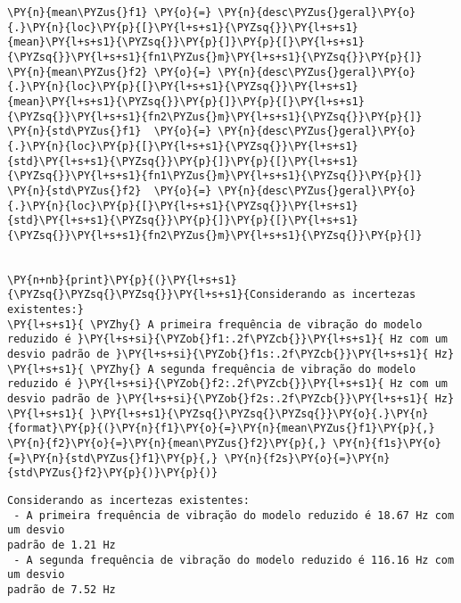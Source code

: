     \begin{tcolorbox}[breakable, size=fbox, boxrule=1pt, pad at break*=1mm,colback=cellbackground, colframe=cellborder]
\begin{Verbatim}[commandchars=\\\{\}]
\PY{n}{mean\PYZus{}f1} \PY{o}{=} \PY{n}{desc\PYZus{}geral}\PY{o}{.}\PY{n}{loc}\PY{p}{[}\PY{l+s+s1}{\PYZsq{}}\PY{l+s+s1}{mean}\PY{l+s+s1}{\PYZsq{}}\PY{p}{]}\PY{p}{[}\PY{l+s+s1}{\PYZsq{}}\PY{l+s+s1}{fn1\PYZus{}m}\PY{l+s+s1}{\PYZsq{}}\PY{p}{]}
\PY{n}{mean\PYZus{}f2} \PY{o}{=} \PY{n}{desc\PYZus{}geral}\PY{o}{.}\PY{n}{loc}\PY{p}{[}\PY{l+s+s1}{\PYZsq{}}\PY{l+s+s1}{mean}\PY{l+s+s1}{\PYZsq{}}\PY{p}{]}\PY{p}{[}\PY{l+s+s1}{\PYZsq{}}\PY{l+s+s1}{fn2\PYZus{}m}\PY{l+s+s1}{\PYZsq{}}\PY{p}{]}
\PY{n}{std\PYZus{}f1}  \PY{o}{=} \PY{n}{desc\PYZus{}geral}\PY{o}{.}\PY{n}{loc}\PY{p}{[}\PY{l+s+s1}{\PYZsq{}}\PY{l+s+s1}{std}\PY{l+s+s1}{\PYZsq{}}\PY{p}{]}\PY{p}{[}\PY{l+s+s1}{\PYZsq{}}\PY{l+s+s1}{fn1\PYZus{}m}\PY{l+s+s1}{\PYZsq{}}\PY{p}{]}
\PY{n}{std\PYZus{}f2}  \PY{o}{=} \PY{n}{desc\PYZus{}geral}\PY{o}{.}\PY{n}{loc}\PY{p}{[}\PY{l+s+s1}{\PYZsq{}}\PY{l+s+s1}{std}\PY{l+s+s1}{\PYZsq{}}\PY{p}{]}\PY{p}{[}\PY{l+s+s1}{\PYZsq{}}\PY{l+s+s1}{fn2\PYZus{}m}\PY{l+s+s1}{\PYZsq{}}\PY{p}{]}


\PY{n+nb}{print}\PY{p}{(}\PY{l+s+s1}{\PYZsq{}\PYZsq{}\PYZsq{}}\PY{l+s+s1}{Considerando as incertezas existentes:}
\PY{l+s+s1}{ \PYZhy{} A primeira frequência de vibração do modelo reduzido é }\PY{l+s+si}{\PYZob{}f1:.2f\PYZcb{}}\PY{l+s+s1}{ Hz com um desvio padrão de }\PY{l+s+si}{\PYZob{}f1s:.2f\PYZcb{}}\PY{l+s+s1}{ Hz}
\PY{l+s+s1}{ \PYZhy{} A segunda frequência de vibração do modelo reduzido é }\PY{l+s+si}{\PYZob{}f2:.2f\PYZcb{}}\PY{l+s+s1}{ Hz com um desvio padrão de }\PY{l+s+si}{\PYZob{}f2s:.2f\PYZcb{}}\PY{l+s+s1}{ Hz}
\PY{l+s+s1}{ }\PY{l+s+s1}{\PYZsq{}\PYZsq{}\PYZsq{}}\PY{o}{.}\PY{n}{format}\PY{p}{(}\PY{n}{f1}\PY{o}{=}\PY{n}{mean\PYZus{}f1}\PY{p}{,} \PY{n}{f2}\PY{o}{=}\PY{n}{mean\PYZus{}f2}\PY{p}{,} \PY{n}{f1s}\PY{o}{=}\PY{n}{std\PYZus{}f1}\PY{p}{,} \PY{n}{f2s}\PY{o}{=}\PY{n}{std\PYZus{}f2}\PY{p}{)}\PY{p}{)}
\end{Verbatim}
\end{tcolorbox}

    \begin{Verbatim}[commandchars=\\\{\}]
Considerando as incertezas existentes:
 - A primeira frequência de vibração do modelo reduzido é 18.67 Hz com um desvio
padrão de 1.21 Hz
 - A segunda frequência de vibração do modelo reduzido é 116.16 Hz com um desvio
padrão de 7.52 Hz

    \end{Verbatim}

